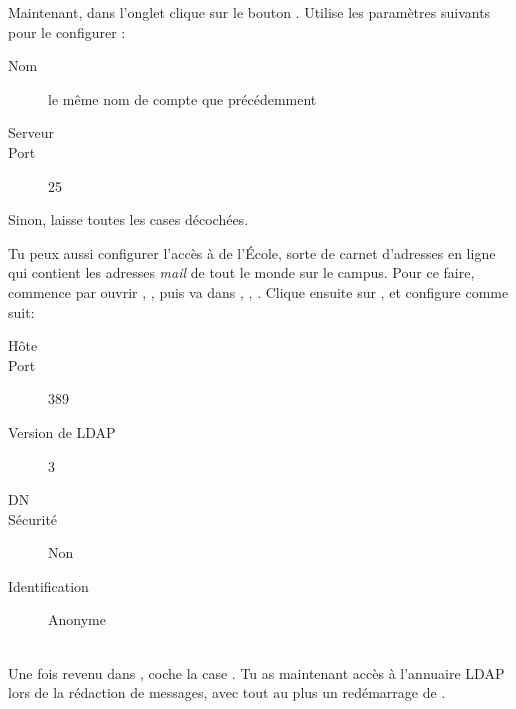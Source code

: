 Maintenant, dans l'onglet  clique sur le
bouton . Utilise les param\`etres suivants pour le
configurer :
\begin{description}
  \item[Nom] le m\^eme nom de compte que pr\'ec\'edemment
  \item[Serveur] 
  \item[Port] 25
\end{description}
Sinon, laisse toutes les cases d\'ecoch\'ees.

Tu peux aussi configurer l'acc\`es \`a   de l'\'Ecole, sorte de carnet d'adresses en ligne qui contient les adresses \emph{mail} de tout le monde sur le campus. Pour ce faire, commence par ouvrir , , puis va dans , , . Clique ensuite sur , et configure comme suit: \\
\smallskip
\begin{minipage}[t]{0.48\textwidth}
\begin{description}
  \item[H\^ote] 
  \item[Port] 389
  \item[Version de LDAP] 3
\end{description}  
\end{minipage} 
\begin{minipage}[t]{0.48\textwidth}
\begin{description}  
  \item[DN] 
  \item[S\'ecurit\'e] Non
  \item[Identification] Anonyme
\end{description}
\end{minipage} \\
Une fois revenu dans , coche la case . Tu as maintenant acc\`es \`a  l'annuaire LDAP lors de la
r\'edaction de messages, avec tout au plus un red\'emarrage de . 
%
%
\noindent
